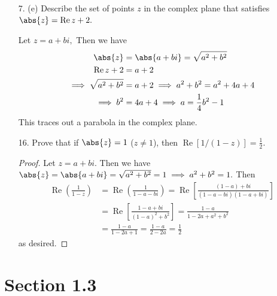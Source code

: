 \documentclass{article}
\DeclareMathOperator{\re}{Re}
\begin{document}
\begin{itemize}
	\item[7.] (e) Describe the set of points $z$ in the complex plane that satisfies $\abs{z}=\re z+2.$
		\begin{soln}
			Let $z=a+bi,$ Then we have
			\begin{align*}
				\abs{z} &= \abs{a+bi} = \sqrt{a^2+b^2} \\
				\re z + 2 &= a+2 \\
				\implies \sqrt{a^2+b^2} &= a+2 \implies a^2+b^2 = a^2+4a+4 \\
				\implies b^2&=4a+4 \implies a = \frac{1}{4} b^2-1
			\end{align*}
			This traces out a parabola in the complex plane. 
		\end{soln}

	\item[16.] Prove that if $\abs{z}=1$ ($z\neq 1$), then $\re[1/(1-z)]=\frac{1}{2}.$
		\begin{proof}
			Let $z=a+bi.$ Then we have $\abs{z}=\abs{a+bi}=\sqrt{a^2+b^2}=1\implies a^2+b^2=1.$ Then
			\begin{align*}
				\re \left( \frac{1}{1-z} \right) &= \re \left( \frac{1}{1-a-bi} \right) = \re\left[ \frac{(1-a)+bi}{(1-a-bi)(1-a+bi)} \right] \\
				&= \re \left[ \frac{1-a+bi}{(1-a)^2+b^2} \right] = \frac{1-a}{1-2a+a^2+b^2} \\
				&= \frac{1-a}{1-2a+1} = \frac{1-a}{2-2a} = \frac{1}{2}
			\end{align*}
			as desired.
		\end{proof}
		
\end{itemize}

\section*{Section 1.3}
\end{document}

